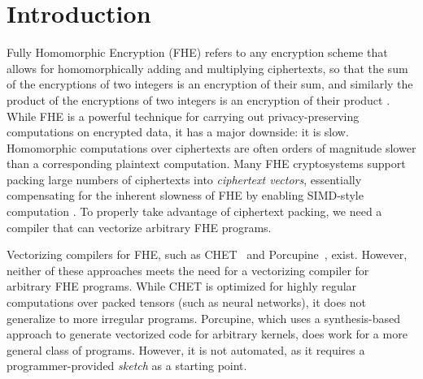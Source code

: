 \section{Introduction}\label{sec:intro}

Fully Homomorphic Encryption (FHE) refers to any encryption scheme that allows for homomorphically adding and multiplying ciphertexts, so that the sum of the encryptions of two integers is an encryption of their sum, and similarly the product of the encryptions of two integers is an encryption of their product \cite{Gentry}.
While FHE is a powerful technique for carrying out privacy-preserving computations on encrypted data, it has a major downside: it is slow.
Homomorphic computations over ciphertexts are often orders of magnitude slower than a corresponding plaintext computation.
Many FHE cryptosystems support packing large numbers of ciphertexts into {\em ciphertext vectors}, essentially compensating for the inherent slowness of FHE by enabling SIMD-style computation \cite{BrakerskiPacking,SmartPacking}.
To properly take advantage of ciphertext packing, we need a compiler that can vectorize arbitrary FHE programs.

Vectorizing compilers for FHE, such as CHET~\cite{CHET} and Porcupine~\cite{Porcupine}, exist.
However, neither of these approaches meets the need for a vectorizing compiler for arbitrary FHE programs.
While CHET is optimized for highly regular computations over packed tensors (such as neural networks), it does not generalize to more irregular programs. 
Porcupine, which uses a synthesis-based approach to generate vectorized code for arbitrary kernels, does work for a more general class of programs.
However, it is not automated, as it requires a programmer-provided {\em sketch} as a starting point.


